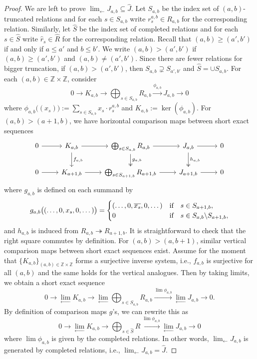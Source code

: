 \documentclass[10pt]{amsart}
\newcommand{\BZ}{\mathbb{Z}}
\newcommand{\+}{{}^+}
\theoremstyle{definition}
\theoremstyle {definition}
\theoremstyle {definition}
\begin{document}
\begin{proof}
We are left to prove $\displaystyle\lim_{\longleftarrow} J_{a,b}\subseteq \widehat J$. Let $S_{a,b}$ be the index set of $(a,b)$-truncated relations and for each $s\in S_{a,b}$ write $r_s^{a,b}\in R_{a,b}$ for the corresponding relation. Similarly, let $\widehat S$ be the index set of completed relations and for each $s\in \widehat S$ write $\widehat r_s\in \widehat R$ for the corresponding relation. Recall that $(a,b)\geq (a',b')$ if and only if $a\leq a'$ and $b\leq b'$. We write $(a,b)>(a',b')$ if $(a,b)\geq (a',b')$ and $(a,b)\neq (a',b')$. Since there are fewer relations for bigger truncation, if $(a,b)>(a',b')$, then $S_{a,b}\supsetneq S_{a',b'}$ and $\widehat S = \cup S_{a,b}$. For each $(a,b)\in \BZ\times \BZ$, consider
$$0\rightarrow K_{a,b}\rightarrow \bigoplus_{s\in S_{a,b}}R_{a,b}\xrightarrow{\phi_{a,b}} J_{a,b}\rightarrow 0
$$
where $\phi_{a,b}\big((x_s)\big):=\sum_{s\in S_{a,b}} x_s\cdot r^{a,b}_s$ and $K_{a,b}:=\ker(\phi_{a,b})$. For $(a,b)>(a+1,b)$, we have horizontal comparison maps between short exact sequences
\begin{equation}\label{eqn: fa diagram}
    \begin{tikzcd}
0 \arrow[r] & K_{a,b} \arrow[r] \arrow[d, "f_{a,b}"]   & \bigoplus_{s\in S_{a,b}} R_{a,b} \arrow[r] \arrow[d, two heads, "g_{a,b}"]   & J_{a,b} \arrow[r] \arrow[d, two heads, "h_{a,b}"]     & 0 \\
0 \arrow[r] & K_{a+1,b} \arrow[r]& \bigoplus_{s\in S_{a+1,b}}R_{a+1,b} \arrow[r] & J_{a+1,b} \arrow[r] &0
\end{tikzcd}
\end{equation}
where $g_{a,b}$ is defined on each summand by
$$g_{a,b}\big((\dots, 0, x_s, 0, \dots)\big)=\begin{cases}
    (\dots, 0, \overline{x_s}, 0, \dots) &\textnormal{if}\quad s\in S_{a+1,b},\\
    0&\textnormal{if}\quad s\in S_{a,b}\backslash S_{a+1,b},
\end{cases}
$$
and $h_{a,b}$ is induced from $R_{a,b}\twoheadrightarrow R_{a+1,b}$. It is straightforward to check that the right square commutes by definition. For $(a,b)>(a,b+1)$, similar vertical comparison maps between short exact sequences exist. Assume for the moment that $\{K_{a,b}\}_{(a,b)\in \BZ\times\BZ}$ forms a surjective inverse system, i.e., $f_{a,b}$ is surjective for all $(a,b)$ and the same holds for the vertical analogues. Then by taking limits, we obtain a short exact sequence 
$$0\rightarrow \lim_{\longleftarrow} K_{a,b}\rightarrow \lim_{\longleftarrow} \bigoplus_{s\in S_{a,b}}R_{a,b}\xrightarrow{\lim\phi_{a,b}} \lim_{\longleftarrow} J_{a,b}\rightarrow 0.
$$
By definition of comparison maps $g$'s, we can rewrite this as
$$0\rightarrow \lim_{\longleftarrow} K_{a,b}\rightarrow \bigoplus_{s\in \widehat S}\widehat R\xrightarrow{\lim\phi_{a,b}} \lim_{\longleftarrow} J_{a,b}\rightarrow 0
$$
where $\lim\phi_{a,b}$ is given by the completed relations. In other words, $\displaystyle \lim_{\longleftarrow} J_{a,b}$ is generated by completed relations, i.e., $\displaystyle\lim_{\longleftarrow} J_{a,b}= \widehat J$.


\end{proof}
\end{document}
